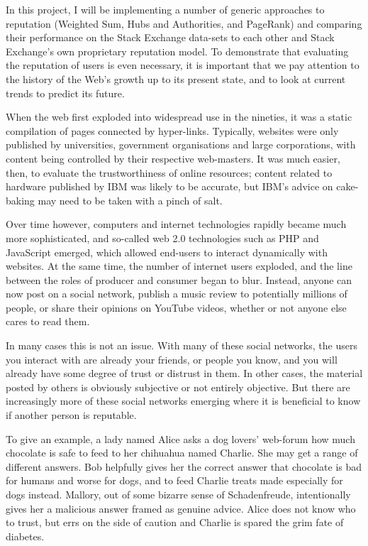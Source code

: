 \documentclass[]{final_report}
\begin{document}
In this project, I will be implementing a number of generic approaches to reputation (Weighted Sum, Hubs and Authorities, and PageRank) and comparing their performance on the Stack Exchange data-sets to each other and Stack Exchange's own proprietary reputation model. To demonstrate that evaluating the reputation of users is even necessary, it is important that we pay attention to the history of the Web's growth up to its present state, and to look at current trends to predict its future.

When the web first exploded into widespread use in the nineties, it was a static compilation of pages connected by hyper-links. Typically, websites were only published by universities, government organisations and large corporations, with content being controlled by their respective web-masters. It was much easier, then, to evaluate the trustworthiness of online resources; content related to hardware published by IBM was likely to be accurate, but IBM's advice on cake-baking may need to be taken with a pinch of salt.

Over time however, computers and internet technologies rapidly became much more sophisticated, and so-called web 2.0 technologies such as PHP and JavaScript emerged, which allowed end-users to interact dynamically with websites. At the same time, the number of internet users exploded, and the line between the roles of producer and consumer began to blur. Instead, anyone can now post on a social network, publish a music review to potentially millions of people, or share their opinions on YouTube videos, whether or not anyone else cares to read them.

In many cases this is not an issue. With many of these social networks, the users you interact with are already your friends, or people you know, and you will already have some degree of trust or distrust in them. In other cases, the material posted by others is obviously subjective or not entirely objective. But there are increasingly more of these social networks emerging where it is beneficial to know if another person is reputable.

To give an example, a lady named Alice asks a dog lovers' web-forum how much chocolate is safe to feed to her chihuahua named Charlie. She may get a range of different answers. Bob helpfully gives her the correct answer that chocolate is bad for humans and worse for dogs, and to feed Charlie treats made especially for dogs instead. Mallory, out of some bizarre sense of Schadenfreude, intentionally gives her a malicious answer framed as genuine advice. Alice does not know who to trust, but errs on the side of caution and Charlie is spared the grim fate of diabetes.
\end{document}

